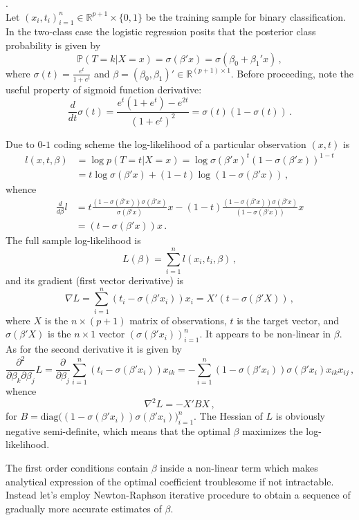 \documentclass[a4paper]{article}
\newcommand{\Real}{\mathbb{R}}
\newcommand{\pr}{\mathbb{P}}
\begin{document}
 .\hfill\\

Let $(x_i,t_i)_{i=1}^n \in \Real^{p+1}\times \{0,1\}$ be the training sample for binary
classification. In the two-class case the logistic regression posits that the posterior
class probability is given by
\[ \pr(T=k|X=x) = \sigma(\beta'x) = \sigma( \beta_0 + \beta_1'x ) \,, \]
where $\sigma(t) = \frac{e^t}{1+e^t}$ and $\beta=(\beta_0, \beta_1)'\in \Real^{(p+1)\times 1}$.
Before proceeding, note the useful property of sigmoid function derivative:
\[
\frac{d}{dt} \sigma(t)
= \frac{e^t(1+e^t) - e^{2t} }{(1+e^t)^2}
= \sigma(t)(1-\sigma(t)) \,.
\]

Due to $0$-$1$ coding scheme the log-likelihood of a particular observation $(x,t)$
is
\begin{align*}
l(x,t,\beta)
&= \log p(T=t|X=x)
= \log \sigma(\beta'x)^t (1-\sigma(\beta'x))^{1-t}\\
&= t \log \sigma(\beta'x) + (1-t)\log (1-\sigma(\beta'x))\,,
\end{align*}
whence
\begin{align*}
	\frac{d}{d\beta} l
	&= t \frac{(1-\sigma(\beta'x))\sigma(\beta'x)}{\sigma(\beta'x)} x
		- (1-t) \frac{ (1-\sigma(\beta'x))\sigma(\beta'x) }{(1-\sigma(\beta'x))} x\\
	&= ( t - \sigma(\beta'x) ) x\,.
\end{align*}
The full sample log-likelihood is 
\[ L( \beta ) = \sum_{i=1}^n l(x_i,t_i,\beta) \,, \]
and its gradient (first vector derivative) is
\[
\nabla L
= \sum_{i=1}^n ( t_i - \sigma(\beta'x_i) ) x_i
= X' ( t - \sigma(\beta'X) )
\,, \]
where $X$ is the $n\times (p+1)$ matrix of observations, $t$ is the target vector, and
$\sigma(\beta'X)$ is the $n\times 1$ vector $(\sigma(\beta'x_i))_{i=1}^n$. It appears
to be non-linear in $\beta$. As for the second derivative it is given by
\[
\frac{\partial^2 }{\partial \beta_k \partial \beta_j} L
= \frac{\partial }{\partial \beta_j} \sum_{i=1}^n ( t_i - \sigma(\beta'x_i) ) x_{ik}
= - \sum_{i=1}^n (1-\sigma(\beta'x_i))\sigma(\beta'x_i) x_{ik} x_{ij}\,,
\]
whence
\[ \nabla^2 L = - X'B X\,, \]
for $B = \text{diag}\bigl( (1-\sigma(\beta'x_i))\sigma(\beta'x_i) \bigr)_{i=1}^n$.
The Hessian of $L$ is obviously negative semi-definite, which means that the optimal
$\beta$ maximizes the log-likelihood.

The first order conditions contain $\beta$ inside a non-linear term which makes
analytical expression of the optimal coefficient troublesome if not intractable.
Instead let's employ Newton-Raphson iterative procedure to obtain a sequence of
gradually more accurate estimates of $\beta$.
\end{document}
